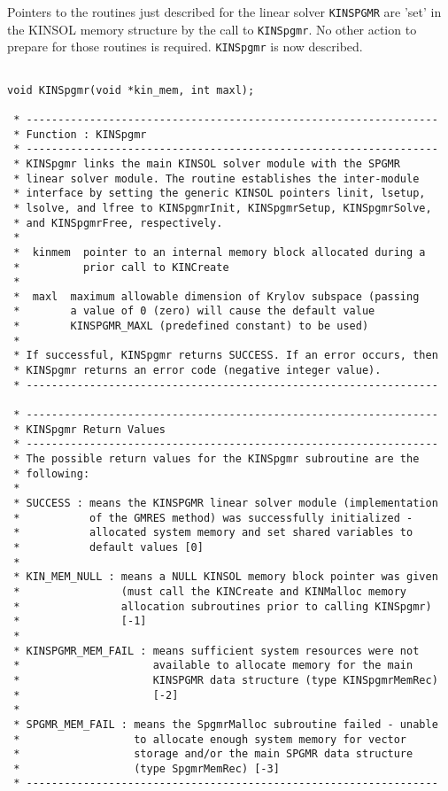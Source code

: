 \documentclass[11pt]{article}
\begin{document}
Pointers to the routines just described for the linear solver {\tt KINSPGMR} 
are 'set' in the KINSOL memory structure by the call to {\tt KINSpgmr}. No 
other action to prepare for those routines is required. {\tt KINSpgmr} is now 
described.
\small
\begin{verbatim}

void KINSpgmr(void *kin_mem, int maxl);

 * -----------------------------------------------------------------
 * Function : KINSpgmr
 * -----------------------------------------------------------------
 * KINSpgmr links the main KINSOL solver module with the SPGMR
 * linear solver module. The routine establishes the inter-module
 * interface by setting the generic KINSOL pointers linit, lsetup,
 * lsolve, and lfree to KINSpgmrInit, KINSpgmrSetup, KINSpgmrSolve,
 * and KINSpgmrFree, respectively.
 *
 *  kinmem  pointer to an internal memory block allocated during a
 *          prior call to KINCreate
 *
 *  maxl  maximum allowable dimension of Krylov subspace (passing
 *        a value of 0 (zero) will cause the default value
 *        KINSPGMR_MAXL (predefined constant) to be used)
 *
 * If successful, KINSpgmr returns SUCCESS. If an error occurs, then
 * KINSpgmr returns an error code (negative integer value).
 * -----------------------------------------------------------------

 * -----------------------------------------------------------------
 * KINSpgmr Return Values
 * -----------------------------------------------------------------
 * The possible return values for the KINSpgmr subroutine are the
 * following:
 *
 * SUCCESS : means the KINSPGMR linear solver module (implementation
 *           of the GMRES method) was successfully initialized -
 *           allocated system memory and set shared variables to
 *           default values [0]
 *
 * KIN_MEM_NULL : means a NULL KINSOL memory block pointer was given
 *                (must call the KINCreate and KINMalloc memory
 *                allocation subroutines prior to calling KINSpgmr)
 *                [-1]
 *
 * KINSPGMR_MEM_FAIL : means sufficient system resources were not
 *                     available to allocate memory for the main
 *                     KINSPGMR data structure (type KINSpgmrMemRec)
 *                     [-2]
 *
 * SPGMR_MEM_FAIL : means the SpgmrMalloc subroutine failed - unable
 *                  to allocate enough system memory for vector
 *                  storage and/or the main SPGMR data structure
 *                  (type SpgmrMemRec) [-3]
 * -----------------------------------------------------------------
\end{verbatim}
\normalsize
\end{document}
